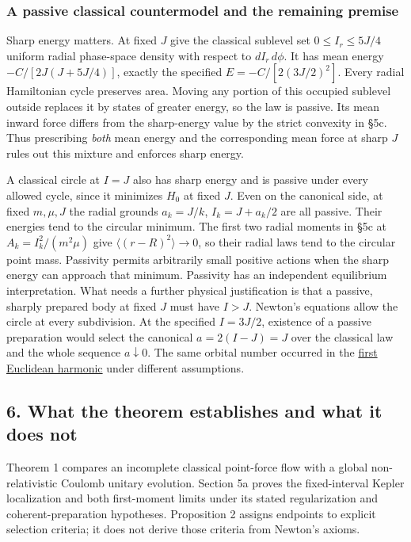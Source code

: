 \documentclass[11pt,a4paper]{article}
\begin{document}
\subsubsection{A passive classical countermodel and the remaining
premise}\label{a-passive-classical-countermodel-and-the-remaining-premise}

Sharp energy matters. At fixed \(J\) give the classical sublevel set
\(0\le I_r\le5J/4\) uniform radial phase-space density with respect to
\(dI_r\,d\phi\). It has mean energy \(-C/[2J(J+5J/4)]\), exactly the
specified \(E=-C/[2(3J/2)^2]\). Every radial Hamiltonian cycle preserves
area. Moving any portion of this occupied sublevel outside replaces it
by states of greater energy, so the law is passive. Its mean inward
force differs from the sharp-energy value by the strict convexity in
§5c. Thus prescribing \emph{both} mean energy and the corresponding mean
force at sharp \(J\) rules out this mixture and enforces sharp energy.

A classical circle at \(I=J\) also has sharp energy and is passive under
every allowed cycle, since it minimizes \(H_0\) at fixed \(J\). Even on
the canonical side, at fixed \(m,\mu,J\) the radial grounds \(a_k=J/k\),
\(I_k=J+a_k/2\) are all passive. Their energies tend to the circular
minimum. The first two radial moments in §5c at \(A_k=I_k^2/(m^2\mu)\)
give \(\langle(r-R)^2\rangle\to0\), so their radial laws tend to the
circular point mass. Passivity permits arbitrarily small positive
actions when the sharp energy can approach that minimum. Passivity has
an independent equilibrium interpretation. What needs a further physical
justification is that a passive, sharply prepared body at fixed \(J\)
must have \(I>J\). Newton's equations allow the circle at every
subdivision. At the specified \(I=3J/2\), existence of a passive
preparation would select the canonical \(a=2(I-J)=J\) over the classical
law and the whole sequence \(a\downarrow0\). The same orbital number
occurred in the
\href{alpoge-balaban-newton-peek.md\#what-follows-from-keeping-the-orbital-frequencies}{first
Euclidean harmonic} under different assumptions.

\subsection{6. What the theorem establishes and what it does
not}\label{what-the-theorem-establishes-and-what-it-does-not}

Theorem 1 compares an incomplete classical point-force flow with a
global non-relativistic Coulomb unitary evolution. Section 5a proves the
fixed-interval Kepler localization and both first-moment limits under
its stated regularization and coherent-preparation hypotheses.
Proposition 2 assigns endpoints to explicit selection criteria; it does
not derive those criteria from Newton's axioms.
\end{document}

